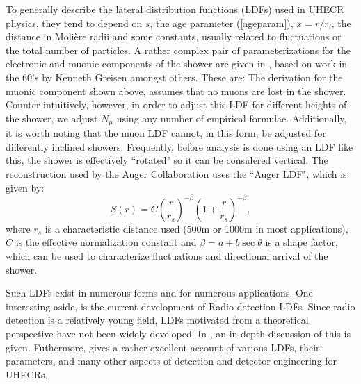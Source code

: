 To generally describe the lateral distribution functions (LDFs) used in UHECR physics, they tend to depend on $s$, the age parameter (\autoref{ageparam}), $x=r/r_i$, the distance in Moli\`{e}re radii and some constants, usually related to fluctuations or the total number of particles. A rather complex pair of parameterizations for the electronic and muonic components of the shower are given in , based on work in the 60's by Kenneth Greisen amongst others. These are:
The derivation for the muonic component shown above, assumes that no muons are lost in the shower. Counter intuitively, however, in order to adjust this LDF for different heights of the shower, we adjust $N_\mu$ using any number of empirical formulae. Additionally, it is worth noting that the muon LDF cannot, in this form, be adjusted for differently inclined showers. Frequently, before analysis is done using an LDF like this, the shower is effectively ``rotated" so it can be considered vertical. The reconstruction used by the Auger Collaboration uses the ``Auger LDF", which is given by:
$$S(r)=\tilde C \left(\frac{r}{r_s}\right)^{-\beta}\left(1+\frac{r}{r_s}\right)^{-\beta},$$
where $r_s$ is a characteristic distance used (500m or 1000m in most applications), $\tilde{C}$ is the effective normalization constant and $\beta=a+b\sec\theta$ is a shape factor, which can be used to characterize fluctuations and directional arrival of the shower. 

Such LDFs exist in numerous forms and for numerous applications. One interesting aside, is the current development of Radio detection LDFs. Since radio detection is a relatively young field, LDFs motivated from a theoretical perspective have not been widely developed. In , an in depth discussion of this is given. Futhermore,  gives a rather excellent account of various LDFs, their parameters, and many other aspects of detection and detector engineering for UHECRs. 
